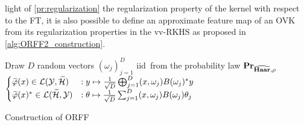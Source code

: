 \documentclass[twoside,11pt]{article}
\begin{document}
light of \cref{pr:regularization} the regularization property of the kernel
with respect to the \acl{FT}, it is also possible to define an approximate
feature map of an \acl{OVK} from its regularization properties in the
\acs{vv-RKHS} as proposed in \cref{alg:ORFF2_construction}.
\begin{center}
    \begin{algorithm2e}[t!]\label{alg:ORFF2_construction}
        \SetAlgoLined
        \BlankLine
        Draw $D$ random vectors $(\omega_j)_{j=1}^D$ \ac{iid}~from the
        probability law ${\mathbf{{Pr}}}_{\widehat{\mathbf{Haar}},\rho}$\;
        \Return $
        \begin{cases}
            \tildePhi{\omega}(x) \in\mathcal{L}(\mathcal{Y}, \tildeH{\omega})
            &: y \mapsto \frac{1}{\sqrt{D}}\Vect_{j=1}^D\pairing{x,
            \omega_j}B(\omega_j)^\adjoint y \\
            \tildePhi{\omega}(x)^\adjoint \in\mathcal{L}(\tildeH{\omega},
            \mathcal{Y}) &: \theta \mapsto \frac{1}{\sqrt{D}} \sum_{j=1}^D
            \pairing{x, \omega_j}B(\omega_j)\theta_j
        \end{cases}$\;
        \caption{Construction of \acs{ORFF}}
    \end{algorithm2e}
\end{center}

\end{document}
